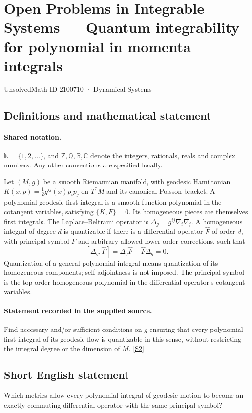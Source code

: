 \documentclass[11pt]{article}
\newcommand{\sref}[2]{\hyperlink{source:#1:#2}{[S#2]}}
\begin{document}
\setcounter{section}{2100709}
\section{Open Problems in Integrable Systems — Quantum integrability for polynomial in momenta integrals}\label{2100710}
{\small\sffamily UnsolvedMath ID 2100710 · Dynamical Systems}
\subsection{Definitions and mathematical statement}

\paragraph{Shared notation.}$\mathbb N=\{1,2,\ldots\}$, and $\mathbb Z,\mathbb Q,\mathbb R,\mathbb C$ denote the integers, rationals, reals and complex numbers. Any other conventions are specified locally.


Let $(M,g)$ be a smooth Riemannian manifold, with geodesic Hamiltonian $K(x,p)=\tfrac12g^{ij}(x)p_ip_j$ on $T^*M$ and its canonical Poisson bracket. A polynomial geodesic first integral is a smooth function polynomial in the cotangent variables, satisfying $\{K,F\}=0$. Its homogeneous pieces are themselves first integrals. The Laplace--Beltrami operator is $\Delta_g=g^{ij}\nabla_i\nabla_j$. A homogeneous integral of degree $d$ is quantizable if there is a differential operator $\widehat F$ of order $d$, with principal symbol $F$ and arbitrary allowed lower-order corrections, such that
\[[\Delta_g,\widehat F]=\Delta_g\widehat F-\widehat F\Delta_g=0.\]
Quantization of a general polynomial integral means quantization of its homogeneous components; self-adjointness is not imposed. The principal symbol is the top-order homogeneous polynomial in the differential operator's cotangent variables.
\paragraph{Statement recorded in the supplied source.}
Find necessary and/or sufficient conditions on $g$ ensuring that every polynomial first integral of its geodesic flow is quantizable in this sense, without restricting the integral degree or the dimension of $M$. \sref{2100710}{2}
\subsection{Short English statement}
Which metrics allow every polynomial integral of geodesic motion to become an exactly commuting differential operator with the same principal symbol?
\end{document}
